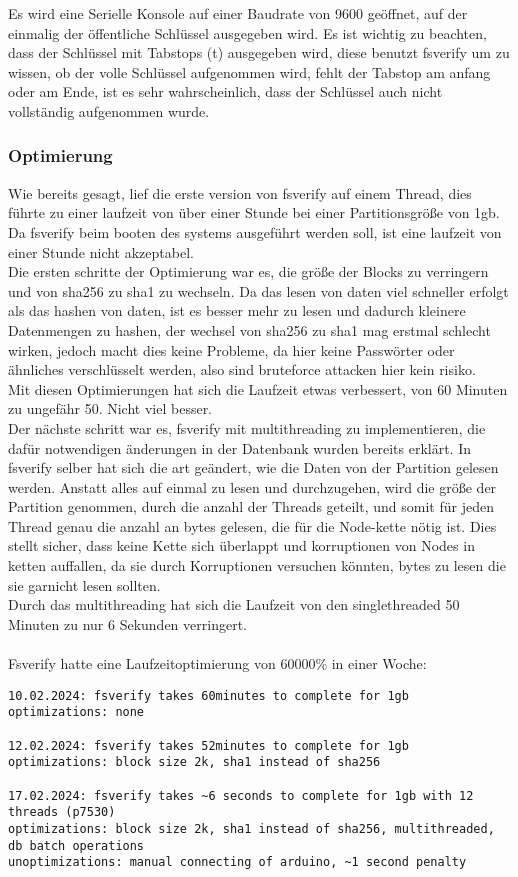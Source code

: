 Es wird eine Serielle Konsole auf einer Baudrate von 9600 geöffnet, auf der einmalig der öffentliche Schlüssel ausgegeben wird. Es ist wichtig zu beachten, dass der Schlüssel mit Tabstops (\backlash t) ausgegeben wird, diese benutzt fsverify um zu wissen, ob der volle Schlüssel aufgenommen wird, fehlt der Tabstop am anfang oder am Ende, ist es sehr wahrscheinlich, dass der Schlüssel auch nicht vollständig aufgenommen wurde.

\subsubsection{Optimierung}
Wie bereits gesagt, lief die erste version von fsverify auf einem Thread, dies führte zu einer laufzeit von über einer Stunde bei einer Partitionsgröße von 1gb. Da fsverify beim booten des systems ausgeführt werden soll, ist eine laufzeit von einer Stunde nicht akzeptabel.
\\
Die ersten schritte der Optimierung war es, die größe der Blocks zu verringern und von sha256 zu sha1 zu wechseln. Da das lesen von daten viel schneller erfolgt als das hashen von daten, ist es besser mehr zu lesen und dadurch kleinere Datenmengen zu hashen, der wechsel von sha256 zu sha1 mag erstmal schlecht wirken, jedoch macht dies keine Probleme, da hier keine Passwörter oder ähnliches verschlüsselt werden, also sind bruteforce attacken hier kein risiko.\\
Mit diesen Optimierungen hat sich die Laufzeit etwas verbessert, von 60 Minuten zu ungefähr 50. Nicht viel besser.
\\
Der nächste schritt war es, fsverify mit multithreading zu implementieren, die dafür notwendigen änderungen in der Datenbank wurden bereits erklärt. In fsverify selber hat sich die art geändert, wie die Daten von der Partition gelesen werden. Anstatt alles auf einmal zu lesen und durchzugehen, wird die größe der Partition genommen, durch die anzahl der Threads geteilt, und somit für jeden Thread genau die anzahl an bytes gelesen, die für die Node-kette nötig ist. Dies stellt sicher, dass keine Kette sich überlappt und korruptionen von Nodes in ketten auffallen, da sie durch Korruptionen versuchen könnten, bytes zu lesen die sie garnicht lesen sollten.\\
Durch das multithreading hat sich die Laufzeit von den singlethreaded 50 Minuten zu nur 6 Sekunden verringert.
\\
\\
Fsverify hatte eine Laufzeitoptimierung von 60000\% in einer Woche:
\begin{verbatim}
10.02.2024: fsverify takes 60minutes to complete for 1gb
optimizations: none

12.02.2024: fsverify takes 52minutes to complete for 1gb
optimizations: block size 2k, sha1 instead of sha256

17.02.2024: fsverify takes ~6 seconds to complete for 1gb with 12 threads (p7530)
optimizations: block size 2k, sha1 instead of sha256, multithreaded, db batch operations
unoptimizations: manual connecting of arduino, ~1 second penalty
\end{verbatim}
